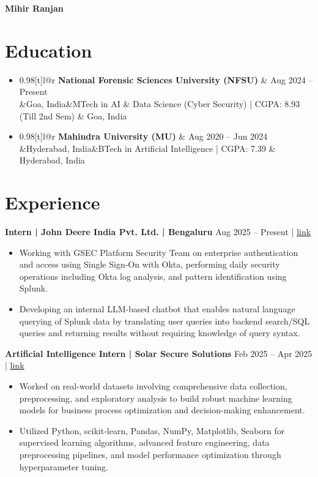 \documentclass[a4paper,10pt]{article}
\makeatletter
\newcommand{\resumeSubheading}[4]{\vspace{0.5mm}\item
  \begin{tabular*}{0.98\textwidth}[t]{l@{\extracolsep{\fill}}r}
    \textbf{#1} & #4 \\
    \ifx&#2&\else #3 & #2 \\ \fi
  \end{tabular*}
  \vspace{-2mm}
}
\newcommand{\resumeSubHeadingListStart}{\begin{itemize}[leftmargin=*,labelsep=1mm,itemsep=0pt]}
\newcommand{\resumeItemListStart}{\begin{itemize}[leftmargin=*,labelsep=1mm,itemsep=0pt,topsep=2pt]}
\newcommand{\resumeSubHeadingListEnd}{\end{itemize}\vspace{1mm}}
\newcommand{\resumeItemListEnd}{\end{itemize}\vspace{1mm}}
\makeatother
\begin{document}
\begin{center}
    {\Huge\textbf{Mihir Ranjan}}
\end{center}

\begin{center}
\normalsize
{}
\end{center}

\section{\textbf{Education}}
\resumeSubHeadingListStart
\resumeSubheading
{National Forensic Sciences University (NFSU)}{Goa, India}
{MTech in AI \& Data Science (Cyber Security) | CGPA: 8.93 (Till 2nd Sem)}{Aug 2024 -- Present}
\resumeSubheading
{Mahindra University (MU)}{Hyderabad, India}
{BTech in Artificial Intelligence | CGPA: 7.39}{Aug 2020 -- Jun 2024}
\resumeSubHeadingListEnd

\section{\textbf{Experience}}

\textbf{Intern | John Deere India Pvt. Ltd. | Bengaluru} \hfill Aug 2025 -- Present |
\href{https://drive.google.com/file/d/1NGKccMNJ6PCJyySXnh-hhefYy7hMsqMX/view?usp=sharing}{link}
\resumeItemListStart
\item Working with GSEC Platform Security Team on enterprise authentication and access using Single Sign-On with Okta, performing daily security operations including Okta log analysis, and pattern identification using Splunk.
\item Developing an internal LLM-based chatbot that enables natural language querying of Splunk data by translating user queries into backend search/SQL queries and returning results without requiring knowledge of query syntax.
\resumeItemListEnd



\textbf{Artificial Intelligence Intern | Solar Secure Solutions} \hfill Feb 2025 -- Apr 2025 | \href{https://drive.google.com/file/d/1v5wkboBHZhA96TD6UUG0w7nRD0ga55KI/view?usp=sharing}{link}
\resumeItemListStart
\item Worked on real-world datasets involving comprehensive data collection, preprocessing, and exploratory analysis to build robust machine learning models for business process optimization and decision-making enhancement.
\item Utilized Python, scikit-learn, Pandas, NumPy, Matplotlib, Seaborn for supervised learning algorithms, advanced feature engineering, data preprocessing pipelines, and model performance optimization through hyperparameter tuning.
\resumeItemListEnd
\end{document}
